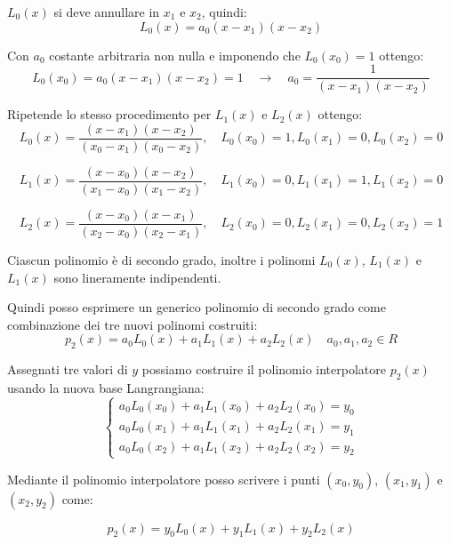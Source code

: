 $L_0(x)$ si deve annullare in $x_1$ e $x_2$, quindi:
\begin{equation}
 L_0(x) = a_0(x - x_1)(x - x_2)
\end{equation}

Con $a_0$ costante arbitraria non nulla e imponendo che $L_0(x_0) = 1$ ottengo:
\begin{equation}
  L_0(x_0) = a_0(x - x_1)(x - x_2) = 1 \quad \rightarrow \quad a_0 = \displaystyle\frac{1}{(x - x_1)(x - x_2) }
\end{equation}

Ripetende lo stesso procedimento per $L_1(x)$ e $L_2(x)$ ottengo:
\begin{equation}
 L_0(x) = \displaystyle\frac{(x - x_1)(x - x_2)}{(x_0 - x_1)(x_0 - x_2)}, \quad L_0(x_0) = 1, L_0(x_1) = 0, L_0(x_2) = 0
\end{equation}

\begin{equation}
 L_1(x) = \displaystyle\frac{(x - x_0)(x - x_2)}{(x_1 - x_0)(x_1 - x_2)}, \quad L_1(x_0) = 0, L_1(x_1) = 1, L_1(x_2) = 0
\end{equation}

\begin{equation}
 L_2(x) = \displaystyle\frac{(x - x_0)(x - x_1)}{(x_2 - x_0)(x_2 - x_1)}, \quad L_2(x_0) = 0, L_2(x_1) = 0, L_2(x_2) = 1
\end{equation}


Ciascun polinomio è di secondo grado, inoltre i polinomi $L_0(x)$, $L_1(x)$ e $L_1(x)$ sono lineramente indipendenti.

Quindi posso esprimere un generico polinomio di secondo grado come combinazione dei tre nuovi polinomi costruiti:
\begin{equation}
 p_2(x) = a_0L_0(x) + a_1L_1(x) + a_2L_2(x) \quad a_0, a_1, a_2 \in R
\end{equation}

Assegnati tre valori di $y$ possiamo costruire il polinomio interpolatore $p_2(x)$ usando la nuova base Langrangiana:
\begin{equation}
  \begin{cases}
        a_0L_0(x_0) + a_1L_1(x_0) + a_2L_2(x_0) = y_0 \\ 
        a_0L_0(x_1) + a_1L_1(x_1) + a_2L_2(x_1) = y_1\\ 
        a_0L_0(x_2) + a_1L_1(x_2) + a_2L_2(x_2) = y_2
  \end{cases}
\end{equation}

Mediante il polinomio interpolatore posso scrivere i punti $(x_0, y_0)$, $(x_1, y_1)$ e $(x_2, y_2)$ come:

\begin{equation}
  p_2(x) = y_0L_0(x) + y_1L_1(x) + y_2L_2(x)
\end{equation}



